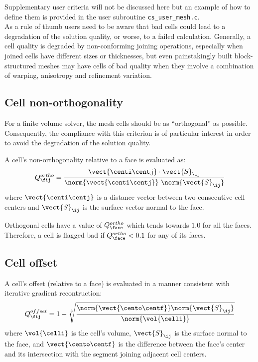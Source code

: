 Supplementary user criteria will not be discussed here but an example of how to
define them is provided in the user subroutine \texttt{cs\_user\_mesh.c}.\\

As a rule of thumb users need to be aware that bad cells could lead to a
degradation of the solution quality, or worse, to a failed calculation.
Generally, a cell quality is degraded by non-conforming joining operations, especially
when joined cells have different sizes or thicknesses, but even painstakingly
built block-structured meshes may have cells of bad quality when they involve
a combination of warping, anisotropy and refinement variation.

\subsection*{Cell non-orthogonality}

For a finite volume solver, the mesh cells should be as ``orthogonal'' as
possible. Consequently, the compliance with this criterion is of particular
interest in order to avoid the degradation of the solution quality.

A cell's non-orthogonality relative to a face is evaluated as:
\begin{equation}
Q^{ortho}_{\fij} = \dfrac{\vect{\centi\centj} \cdot \vect{S}_{\ij}}{\norm{\vect{\centi \centj}} ~ \norm{\vect{S}_{\ij}}}
\end{equation}
where $\vect{\centi\centj}$ is a distance vector between two consecutive cell centers and
$\vect{S}_{\ij}$ is the surface vector normal to the face.

Orthogonal cells have a value of $Q^{ortho}_{\face}$ which tends towards $1.0$ for all the faces.
Therefore, a cell is flagged bad if $Q^{ortho}_{\face} < 0.1$ for any of its faces.

\subsection*{Cell offset}

A cell's offset (relative to a face) is evaluated in a manner consistent with
iterative gradient recontruction:
\begin{equation}
Q^{offset}_{\fij} = 1 - \sqrt[3]{\dfrac{ \norm{\vect{\cento \centf}} \norm{ \vect{S}_{\ij}}}{ \norm{\vol{\celli}} }}
\end{equation}
where $\vol{\celli}$ is the cell's volume, $\vect{S}_{\ij}$ is the surface normal to the face, and
$\vect{\cento \centf}$ is the difference between the face's center and its
intersection with the segment joining adjacent cell centers.

